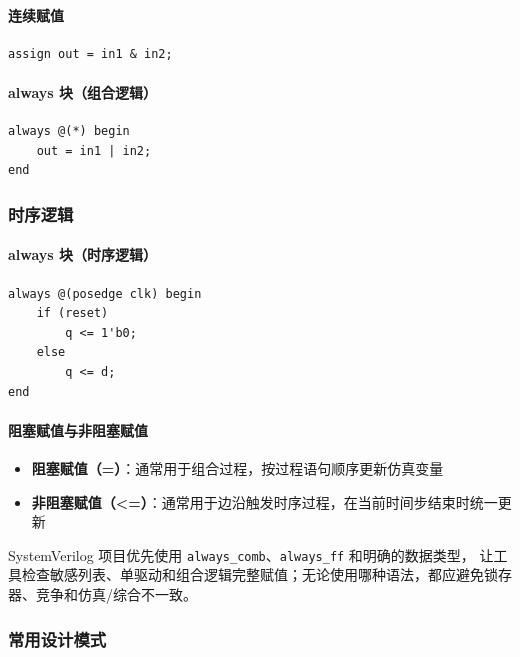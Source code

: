 \paragraph{连续赋值}

\begin{verbatim}
assign out = in1 & in2;
\end{verbatim}

\paragraph{always 块（组合逻辑）}

\begin{verbatim}
always @(*) begin
    out = in1 | in2;
end
\end{verbatim}

\subsubsection{时序逻辑}

\paragraph{always 块（时序逻辑）}

\begin{verbatim}
always @(posedge clk) begin
    if (reset)
        q <= 1'b0;
    else
        q <= d;
end
\end{verbatim}

\paragraph{阻塞赋值与非阻塞赋值}

\begin{itemize}
  \item \textbf{阻塞赋值（=）}：通常用于组合过程，按过程语句顺序更新仿真变量
  \item \textbf{非阻塞赋值（<=）}：通常用于边沿触发时序过程，在当前时间步结束时统一更新
\end{itemize}

SystemVerilog 项目优先使用 \texttt{always\_comb}、\texttt{always\_ff} 和明确的数据类型，
让工具检查敏感列表、单驱动和组合逻辑完整赋值；无论使用哪种语法，都应避免锁存器、竞争和仿真/综合不一致。

\subsubsection{常用设计模式}

